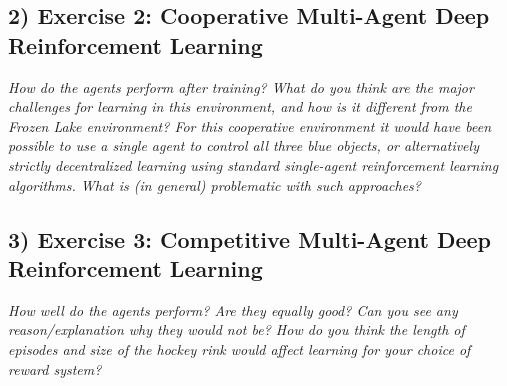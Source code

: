 \documentclass[10pt]{article}
\begin{document}
\subsection*{2) \textbf{ Exercise 2: Cooperative Multi-Agent Deep Reinforcement Learning}}
\textit{How do the agents perform after training? What do you think are the major
 challenges for learning in this environment, and how is it different from the Frozen Lake 
 environment? For this cooperative environment it would have been possible to use a single
 agent to control all three blue objects, or alternatively strictly decentralized learning
 using standard single-agent reinforcement learning algorithms. What is (in general)
 problematic with such approaches?}

\subsection*{3) \textbf{ Exercise 3: Competitive Multi-Agent Deep Reinforcement Learning}}
\textit{How well do the agents perform? Are they equally good? Can you see any 
reason/explanation why they would not be? How do you think the length of episodes and
 size of the hockey rink would affect learning for your choice of reward system?}
\end{document}
